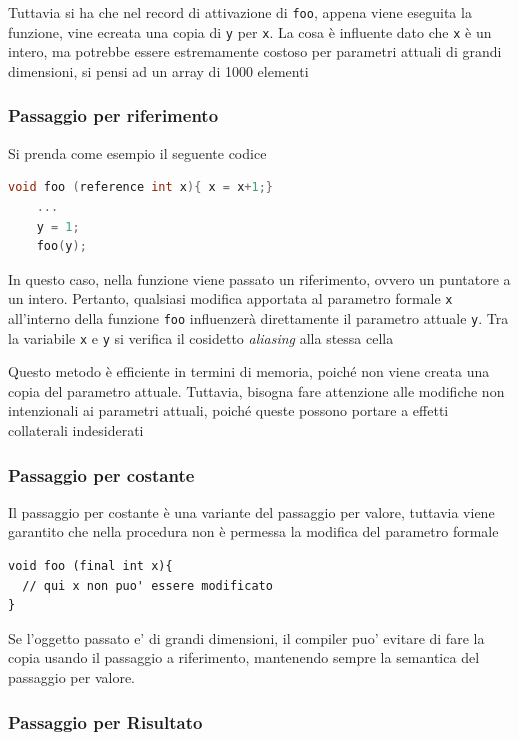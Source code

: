 Tuttavia si ha che nel record  di attivazione di \texttt{foo}, appena viene eseguita la funzione, vine ecreata una copia di \texttt{y} per \texttt{x}. La cosa è influente dato che \texttt{x} è un intero, ma potrebbe essere estremamente costoso per parametri attuali di grandi dimensioni, si pensi ad un array di 1000 elementi

\subsubsection{Passaggio per riferimento}
Si prenda come esempio il seguente codice

\begin{lstlisting}[language=C]
    void foo (reference int x){ x = x+1;}
    ...
    y = 1;
    foo(y);
\end{lstlisting}

In questo caso, nella funzione viene passato un riferimento, ovvero un puntatore a un intero. Pertanto, qualsiasi modifica apportata al parametro formale \texttt{x} all'interno della funzione \texttt{foo} influenzerà direttamente il parametro attuale \texttt{y}. Tra la variabile \texttt{x} e \texttt{y} si verifica il cosidetto \textit{aliasing} alla stessa cella

Questo metodo è efficiente in termini di memoria, poiché non viene creata una copia del parametro attuale. Tuttavia, bisogna fare attenzione alle modifiche non intenzionali ai parametri attuali, poiché queste possono portare a effetti collaterali indesiderati

\subsubsection{Passaggio per costante}

Il passaggio per costante è una variante del passaggio per valore, tuttavia viene garantito che nella procedura non è permessa la modifica del parametro formale

\begin{lstlisting}[style=javastyle]
void foo (final int x){
  // qui x non puo' essere modificato
}
\end{lstlisting}

Se l'oggetto passato e' di grandi dimensioni, il compiler puo' evitare di fare la copia usando il passaggio a riferimento, mantenendo sempre la semantica del passaggio per valore.

\subsubsection{Passaggio per Risultato}

